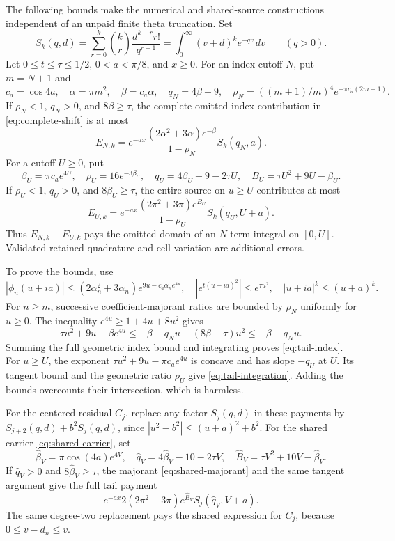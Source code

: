\documentclass[11pt]{article}
\numberwithin{equation}{section}
\theoremstyle{definition}
\theoremstyle{remark}
\newcommand{\dd}{\,d}
\begin{document}
The following bounds make the numerical and shared-source constructions
independent of an unpaid finite theta truncation. Set
\[
 S_k(q,d)=\sum_{r=0}^k\binom kr\frac{d^{k-r}r!}{q^{r+1}}
         =\int_0^\infty(v+d)^ke^{-qv}\dd v\qquad(q>0).
\]
Let $0\le t\le\tau\le1/2$, $0<a<\pi/8$, and $x\ge0$.
For an index cutoff $N$, put $m=N+1$ and
\[
 c_a=\cos4a,\quad \alpha=\pi m^2,\quad \beta=c_a\alpha,
 \quad q_N=4\beta-9,\quad
 \rho_N=((m+1)/m)^4e^{-\pi c_a(2m+1)}.
\]
If $\rho_N<1$, $q_N>0$, and $8\beta\ge\tau$, the complete omitted
index contribution in \eqref{eq:complete-shift} is at most
\begin{equation}
 E_{N,k}=e^{-ax}\frac{(2\alpha^2+3\alpha)e^{-\beta}}{1-\rho_N}
                         S_k(q_N,a).
 \label{eq:tail-index}
\end{equation}
For a cutoff $U\ge0$, put
\[
 \beta_U=\pi c_ae^{4U},\quad \rho_U=16e^{-3\beta_U},\quad
 q_U=4\beta_U-9-2\tau U,\quad B_U=\tau U^2+9U-\beta_U.
\]
If $\rho_U<1$, $q_U>0$, and $8\beta_U\ge\tau$, the entire source
on $u\ge U$ contributes at most
\begin{equation}
 E_{U,k}=e^{-ax}\frac{(2\pi^2+3\pi)e^{B_U}}{1-\rho_U}
                         S_k(q_U,U+a).
 \label{eq:tail-integration}
\end{equation}
Thus $E_{N,k}+E_{U,k}$ pays the omitted domain of an $N$-term integral
on $[0,U]$. Validated retained quadrature and cell variation are
additional errors.

To prove the bounds, use
\[
 |\phi_n(u+ia)|\le(2\alpha_n^2+3\alpha_n)
 e^{9u-c_a\alpha_ne^{4u}},\quad
 |e^{t(u+ia)^2}|\le e^{\tau u^2},\quad |u+ia|^k\le(u+a)^k.
\]
For $n\ge m$, successive coefficient-majorant ratios are bounded by
$\rho_N$ uniformly for $u\ge0$. The inequality
$e^{4u}\ge1+4u+8u^2$ gives
\[
 \tau u^2+9u-\beta e^{4u}
 \le-\beta-q_Nu-(8\beta-\tau)u^2\le-\beta-q_Nu.
\]
Summing the full geometric index bound and integrating proves
\eqref{eq:tail-index}. For $u\ge U$, the exponent
$\tau u^2+9u-\pi c_ae^{4u}$ is concave and has slope $-q_U$ at
$U$. Its tangent bound and the geometric ratio $\rho_U$ give
\eqref{eq:tail-integration}. Adding the bounds overcounts their
intersection, which is harmless.

For the centered residual $C_j$, replace any factor $S_j(q,d)$ in
these payments by $S_{j+2}(q,d)+b^2S_j(q,d)$, since
$|u^2-b^2|\le(u+a)^2+b^2$. For the shared carrier
\eqref{eq:shared-carrier}, set
\[
 \widehat\beta_V=\pi\cos(4a)e^{4V},\quad
 \widehat q_V=4\widehat\beta_V-10-2\tau V,\quad
 \widehat B_V=\tau V^2+10V-\widehat\beta_V.
\]
If $\widehat q_V>0$ and $8\widehat\beta_V\ge\tau$, the majorant
\eqref{eq:shared-majorant} and the same tangent argument give the full
tail payment
\begin{equation}
 e^{-ax}2(2\pi^2+3\pi)e^{\widehat B_V}S_j(\widehat q_V,V+a).
 \label{eq:shared-tail}
\end{equation}
The same degree-two replacement pays the shared expression for $C_j$,
because $0\le v-d_n\le v$.
\end{document}
